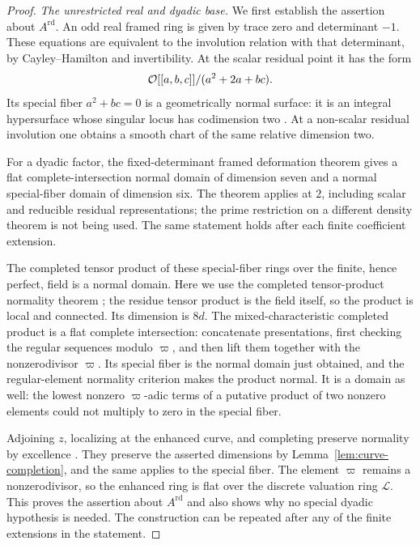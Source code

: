 \begin{proof}
\emph{The unrestricted real and dyadic base.}
We first establish the assertion about $A^{\mathrm{rd}}$.  An odd
real framed ring is given by trace zero and determinant $-1$.
These equations are equivalent to the involution relation with that
determinant, by Cayley--Hamilton and invertibility.  At the scalar
residual point it has the form
\[
\mathcal O[[a,b,c]]/(a^2+2a+bc).
\]
Its special fiber $a^2+bc=0$ is a geometrically normal surface: it is
an integral hypersurface whose singular locus has codimension two
\cite[Tag~031S]{StacksProject}.
At a non-scalar residual involution one obtains a smooth chart of
the same relative dimension two.

For a dyadic factor, the fixed-determinant framed deformation theorem
\cite[Theorem~1.5]{BIP} gives a flat complete-intersection normal
domain of dimension seven and a normal special-fiber domain of
dimension six.  The theorem applies at $2$, including scalar and
reducible residual representations; the prime restriction on a
different density theorem is not being used.  The same statement
holds after each finite coefficient extension.

The completed tensor product of these special-fiber rings over the
finite, hence perfect, field is a normal domain.  Here we use the
completed tensor-product normality theorem
\cite[Theorem~3.3 and Proposition~3.1]{Tabaa2020}; the residue tensor
product is the field itself, so the product is local and connected.
Its dimension is $8d$.  The mixed-characteristic completed product
is a flat complete intersection: concatenate presentations, first
checking the regular sequences modulo $\varpi$, and then lift them
together with the nonzerodivisor $\varpi$.  Its special fiber is the
normal domain just obtained, and the regular-element normality
criterion makes the product normal.  It is a domain as well: the
lowest nonzero $\varpi$-adic terms of a putative product of two
nonzero elements could not multiply to zero in the special fiber.

Adjoining $z$, localizing at the enhanced curve, and completing
preserve normality by excellence
\cite[Tags~07QW and~0C23]{StacksProject}.  They preserve the asserted
dimensions by Lemma~\ref{lem:curve-completion}, and the same applies
to the special fiber.  The element $\varpi$ remains a
nonzerodivisor, so the enhanced ring is flat over the discrete
valuation ring $\mathcal L$.  This proves the assertion about
$A^{\mathrm{rd}}$ and also shows why no special dyadic hypothesis is
needed.  The construction can be repeated after any of the finite
extensions in the statement.


\end{proof}
